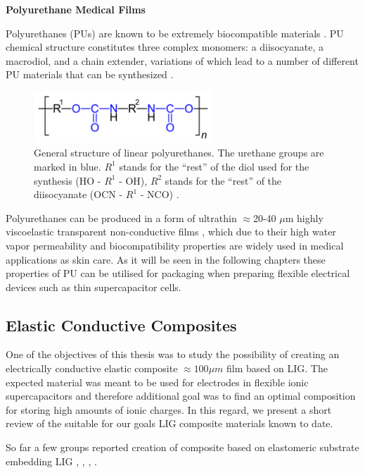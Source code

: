 \textbf{Polyurethane Medical Films}

Polyurethanes (PUs) are known to be extremely biocompatible materials \cite{SASTRI2014121}. PU chemical structure constitutes three complex monomers: a diisocyanate, a macrodiol, and a chain extender, variations of which lead to a number of different PU materials that can be synthesized \cite{KOHLI2019125}.

\begin{figure}[H]
\centering
\includegraphics[width=0.6\textwidth]{Figures/Theory/2880px-Polyurethane-allg.png}
\medskip
\captionsetup{width=0.6\linewidth}
\caption{General structure of linear polyurethanes. The urethane groups are marked in blue. $R^1$ stands for the “rest” of the diol used for the synthesis (HO - $R^1$ - OH), $R^2$ stands for the “rest” of the diisocyanate (OCN - $R^1$ - NCO) \cite{Polyurethanen}.}
\label{fig:PU-structure}
\end{figure}

Polyurethanes can be produced in a form of ultrathin $\approx$20-40 $\mu$m highly viscoelastic transparent non-conductive films \cite{Fixomull}, which due to their high water vapor permeability and biocompatibility properties are widely used in medical applications as skin care. As it will be seen in the following chapters these properties of PU can be utilised for packaging when preparing flexible electrical devices such as thin supercapacitor cells. 


\subsection{Elastic Conductive Composites}

One of the objectives of this thesis was to study the possibility of creating an electrically conductive elastic composite  $\approx 100\mu m$ film based on LIG. The expected material was meant to be used for electrodes in flexible ionic supercapacitors and therefore additional goal was to find an optimal composition for storing high amounts of ionic charges. In this regard, we present a short review of the suitable for our goals LIG composite materials known to date.

So far a few groups reported creation of composite based on elastomeric substrate embedding LIG \cite{dallinger_stretchable_2020}, \cite{jeong_flexible_2019}, \cite{parmeggiani_pdmspolyimide_2019}, \cite{lamberti_highly_2016}.

